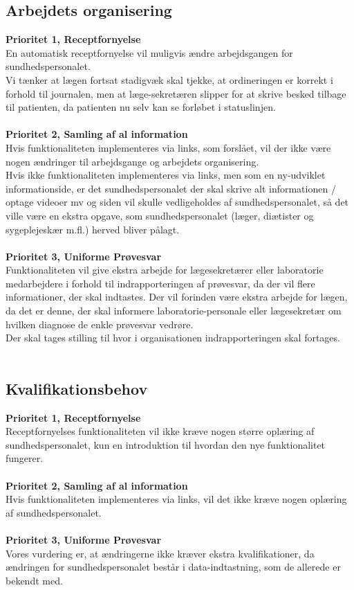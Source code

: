 \subsection{Arbejdets organisering}  
\textbf{Prioritet 1, Receptfornyelse} \\
En automatisk receptfornyelse vil muligvis ændre arbejdsgangen for sundhedspersonalet. \\ 
Vi tænker at lægen fortsat stadigvæk skal tjekke, at ordineringen er korrekt i forhold til journalen, men at læge-sekretæren slipper for at skrive besked tilbage til patienten, da patienten nu selv kan se forløbet i statuslinjen.
%
\\\\
\textbf{Prioritet 2, Samling af al information} \\
Hvis funktionaliteten implementeres via links, som forslået, vil der ikke være nogen ændringer til arbejdsgange og arbejdets organisering. \\
Hvis ikke funktionaliteten implementeres via links, men som en ny-udviklet informationside, er det sundhedspersonalet der skal skrive alt informationen / optage videoer mv og siden vil skulle vedligeholdes af sundhedspersonalet, så det ville være en ekstra opgave, som sundhedspersonalet (læger, diætister og sygeplejeskær m.fl.) herved bliver pålagt.
\\\\
\textbf{Prioritet 3, Uniforme Prøvesvar} \\
Funktionaliteten vil give ekstra arbejde for lægesekretærer eller laboratorie medarbejdere i forhold til indrapporteringen af prøvesvar, da der vil flere informationer, der skal indtastes. Der vil forinden være ekstra arbejde for lægen, da det er denne, der skal informere laboratorie-personale eller lægesekretær om hvilken diagnose de enkle prøvesvar vedrøre.\\
Der skal tages stilling til hvor i organisationen indrapporteringen skal fortages.
\\\\
\subsection{Kvalifikationsbehov}
\textbf{Prioritet 1, Receptfornyelse} \\
Receptfornyelses funktionaliteten vil ikke kræve nogen større oplæring af sundhedspersonalet, kun en introduktion til hvordan den nye funktionalitet fungerer.
\\\\
\textbf{Prioritet 2, Samling af al information} \\
Hvis funktionaliteten implementeres via links, vil det ikke kræve nogen oplæring af sundhedspersonalet.
\\\\
\textbf{Prioritet 3, Uniforme Prøvesvar} \\
Vores vurdering er, at ændringerne ikke kræver ekstra kvalifikationer, da ændringen for sundhedspersonalet består i data-indtastning, som de allerede er bekendt med.